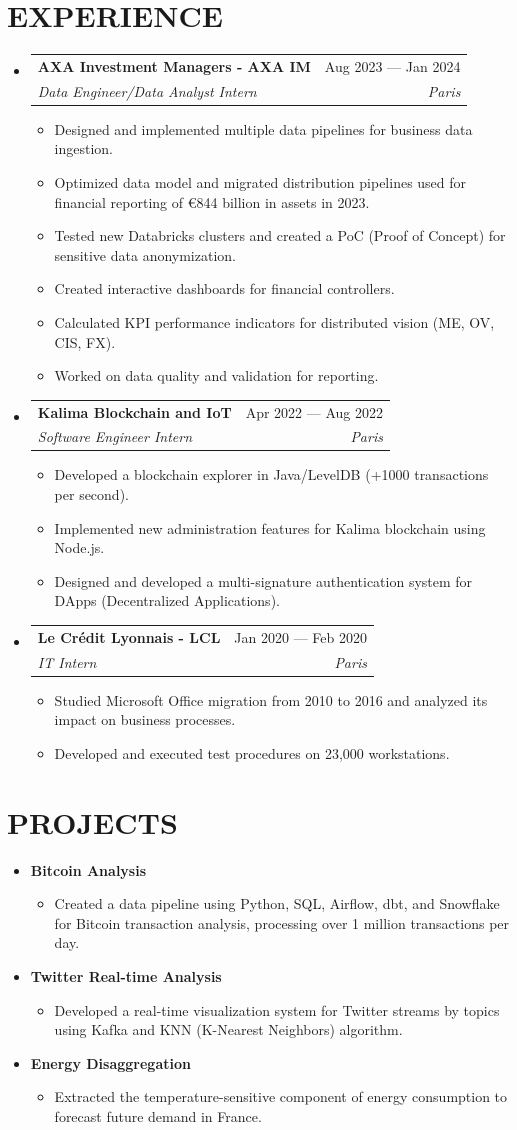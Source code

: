 \documentclass[11pt,a4paper]{article}
\makeatletter
\newcommand{\resumeItem}[1]{
  \item\footnotesize{
    {#1 \vspace{-1pt}}
  }
}
\newcommand{\resumeSubheading}[4]{
  \vspace{2pt}\item
    \begin{tabular*}{\textwidth}[t]{l@{\extracolsep{\fill}}r}
      {\footnotesize\textbf{#1}} & {\footnotesize#2} \\
      {\footnotesize\textit{#3}} & {\footnotesize\textit{#4}} \\
    \end{tabular*}\vspace{2pt}
}
\newcommand{\resumeProjectHeading}[2]{
  \item
  {\footnotesize#1} \hfill {#2}
}
\newcommand{\resumeSubHeadingListStart}{\begin{itemize}[leftmargin=0in, label={}]}
\newcommand{\resumeSubHeadingListEnd}{\end{itemize}}
\newcommand{\resumeItemListStart}{\begin{itemize}[label={\textbullet}]}
\newcommand{\resumeItemListEnd}{\end{itemize}\vspace{0pt}}
\makeatother
\begin{document}
\section{EXPERIENCE}
\resumeSubHeadingListStart
    \resumeSubheading
      {AXA Investment Managers - AXA IM}{Aug 2023 --- Jan 2024}
      {Data Engineer/Data Analyst Intern}{Paris}
      \resumeItemListStart
        \resumeItem{Designed and implemented multiple data pipelines for business data ingestion.}
        \resumeItem{Optimized data model and migrated distribution pipelines used for financial reporting of €844 billion in assets in 2023.}
        \resumeItem{Tested new Databricks clusters and created a PoC (Proof of Concept) for sensitive data anonymization.}
        \resumeItem{Created interactive dashboards for financial controllers.}
        \resumeItem{Calculated KPI performance indicators for distributed vision (ME, OV, CIS, FX).}
        \resumeItem{Worked on data quality and validation for reporting.}
      \resumeItemListEnd
    \resumeSubheading
      {Kalima Blockchain and IoT}{Apr 2022 --- Aug 2022}
      {Software Engineer Intern}{Paris}
      \resumeItemListStart
        \resumeItem{Developed a blockchain explorer in Java/LevelDB (+1000 transactions per second).}
        \resumeItem{Implemented new administration features for Kalima blockchain using Node.js.}
        \resumeItem{Designed and developed a multi-signature authentication system for DApps (Decentralized Applications).}
      \resumeItemListEnd
    \resumeSubheading
      {Le Crédit Lyonnais - LCL}{Jan 2020 --- Feb 2020}
      {IT Intern}{Paris}
      \resumeItemListStart
        \resumeItem{Studied Microsoft Office migration from 2010 to 2016 and analyzed its impact on business processes.}
        \resumeItem{Developed and executed test procedures on 23,000 workstations.}
      \resumeItemListEnd
  \resumeSubHeadingListEnd

\section{PROJECTS}
\resumeSubHeadingListStart
    \resumeProjectHeading
      {\textbf{Bitcoin Analysis}} {}
      \resumeItemListStart
        \resumeItem{Created a data pipeline using Python, SQL, Airflow, dbt, and Snowflake for Bitcoin transaction analysis, processing over 1 million transactions per day.}
      \resumeItemListEnd
    \resumeProjectHeading
      {\textbf{Twitter Real-time Analysis}} {}
      \resumeItemListStart
        \resumeItem{Developed a real-time visualization system for Twitter streams by topics using Kafka and KNN (K-Nearest Neighbors) algorithm.}
      \resumeItemListEnd
    \resumeProjectHeading
      {\textbf{Energy Disaggregation \@Capgemini}} {}
      \resumeItemListStart
        \resumeItem{Extracted the temperature-sensitive component of energy consumption to forecast future demand in France.}
      \resumeItemListEnd
\resumeSubHeadingListEnd
\end{document}
